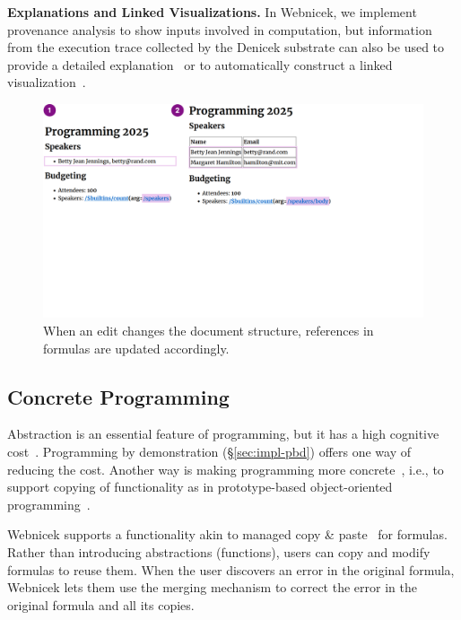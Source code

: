\documentclass[sigconf]{acmart}
\DeclareRobustCommand{\keyideabox}[3]
{\vspace{\dimexpr\baselineskip\relax} \colorbox{gray!20}{
\parbox{\dimexpr\columnwidth-\marginparsep-10pt\relax}
{\small {#1} \textbf{#2.} #3}
}}
\begin{document}
\keyideabox{\faBarChart}{Explanations and Linked Visualizations}{In Webnicek, we implement
provenance analysis to show inputs involved in computation, but information from the execution
trace collected by the Denicek substrate can also be used to provide a detailed
explanation~\cite{perera-2012-functional} or to automatically construct
a linked visualization~\cite{perera-2022-linked}.}


\begin{figure}[t]
\includegraphics[width=0.9\columnwidth,clip,trim=0cm 9.5cm 8cm 0cm]{fig/coevolution.pdf}
\caption{When an edit changes the document structure, references in formulas are updated accordingly.}
\label{fig:coevolution}
\end{figure}



\subsection{Concrete Programming}
\label{sec:impl-copy}

Abstraction is an essential feature of programming, but it has a high cognitive
cost~\cite{blackwell-2002-attention}. Programming by demonstration (\S\ref{sec:impl-pbd})
offers one way of reducing the cost. Another way is making programming more
concrete~\cite{edwards-2004-example,smith-1975-pygmalion}, i.e., to support copying of functionality
as in prototype-based object-oriented programming~\cite{ungar-1987-self,randall-1995-self}.

Webnicek supports a functionality akin to managed copy \&
paste~\cite{edwards-2006-copypaste,edwards-2022-copypaste} for formulas. Rather than introducing
abstractions (functions), users can copy and modify formulas to reuse them. When the user
discovers an error in the original formula, Webnicek lets them use the merging mechanism to correct
the error in the original formula and all its copies.
\end{document}
